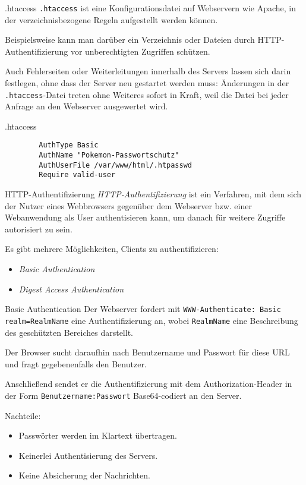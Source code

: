 \begin{bonus}{.htaccess}
    \texttt{.htaccess} ist eine Konfigurationsdatei auf Webservern wie Apache, in der verzeichnisbezogene Regeln aufgestellt werden können.

    Beispielsweise kann man darüber ein Verzeichnis oder Dateien durch HTTP-Authentifizierung vor unberechtigten Zugriffen schützen.

    Auch Fehlerseiten oder Weiterleitungen innerhalb des Servers lassen sich darin festlegen, ohne dass der Server neu gestartet werden muss:
    Änderungen in der \texttt{.htaccess}-Datei treten ohne Weiteres sofort in Kraft, weil die Datei bei jeder Anfrage an den Webserver ausgewertet wird.
\end{bonus}

\begin{example}{.htaccess}
    \begin{lstlisting}
        AuthType Basic
        AuthName "Pokemon-Passwortschutz"
        AuthUserFile /var/www/html/.htpasswd
        Require valid-user
    \end{lstlisting}
\end{example}

\begin{defi}{HTTP-Authentifizierung}
    \emph{HTTP-Authentifizierung} ist ein Verfahren, mit dem sich der Nutzer eines Webbrowsers gegenüber dem Webserver bzw. einer Webanwendung als User authentisieren kann, um danach für weitere Zugriffe autorisiert zu sein.

    Es gibt mehrere Möglichkeiten, Clients zu authentifizieren:
    \begin{itemize}
        \item \emph{Basic Authentication}
        \item \emph{Digest Access Authentication}
    \end{itemize}
\end{defi}

\begin{defi}{Basic Authentication}
    Der Webserver fordert mit \texttt{WWW-Authenticate: Basic realm=\ditto RealmName\ditto} eine Authentifizierung an, wobei \texttt{RealmName} eine Beschreibung des geschützten Bereiches darstellt.

    Der Browser sucht daraufhin nach Benutzername und Passwort für diese URL und fragt gegebenenfalls den Benutzer.

    Anschließend sendet er die Authentifizierung mit dem Authorization-Header in der Form \texttt{Benutzername:Passwort} Base64-codiert an den Server.

    Nachteile:
    \begin{itemize}
        \item Passwörter werden im Klartext übertragen.
        \item Keinerlei Authentisierung des Servers.
        \item Keine Absicherung der Nachrichten.
    \end{itemize}
\end{defi}

